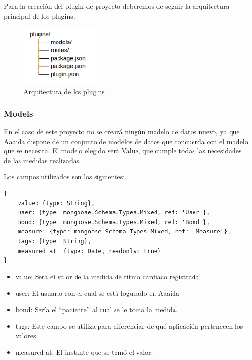 Para la creación del plugin de proyecto deberemos de seguir la arquitectura principal de los plugins.


\begin{figure}[htb]
\begin{center}
\includegraphics[width=0.35\textwidth]{./setup/arc}
\caption{Arquitectura de los plugins}
\end{center}
\end{figure}

\subsubsection{Models}

En el caso de este proyecto no se creará ningún modelo de datos nuevo, ya que Aaaida dispone de un conjunto de modelos de datos que concuerda con el modelo que se necesita. El modelo elegido será Value, que cumple todas las necesidades de las medidas realizadas.

Los campos utilizados son los siguientes:

\begin{verbatim}
{
    value: {type: String},
    user: {type: mongoose.Schema.Types.Mixed, ref: 'User'},
    bond: {type: mongoose.Schema.Types.Mixed, ref: 'Bond'},
    measure: {type: mongoose.Schema.Types.Mixed, ref: 'Measure'},
    tags: {type: String},
    measured_at: {type: Date, readonly: true}
}
\end{verbatim}
\pagebreak

\begin{itemize}
\item value: Será el valor de la medida de ritmo cardiaco registrada. 
\item user: El usuario con el cual se está logueado en Aaaida
\item bond: Sería el “paciente” al cual se le toma la medida.
\item tags: Este campo se utiliza para diferenciar de qué aplicación pertenecen los valores.  
\item measured at: El instante que se tomó el valor. 
\end{itemize}

